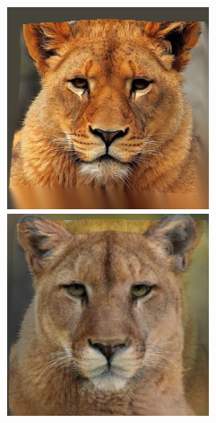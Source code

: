 \documentclass[conference]{IEEEtran}
\begin{document}
\begin{figure}[H]
\begin{multicols}{3}
    \centering
    \includegraphics[width=1.0\linewidth]{TestsCats/XL/img01.png} \par
    \includegraphics[width=1.0\linewidth]{TestsCats/XL/img30.png} \par
    

\end{multicols}
\end{figure}
\end{document}
